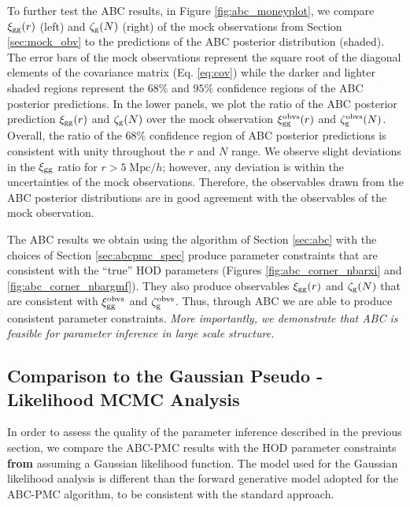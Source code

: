 \documentclass[fleqn,usenatbib]{mnras}
\begin{document}
To further test the ABC results, in Figure \ref{fig:abc_moneyplot}, 
we compare $\xi_{\mathrm{gg}}(r)$ (left) and $\mathcal{\zeta}_{\rm g}(N)$ (right) of the mock observations from Section \ref{sec:mock_obv}
to the predictions of the ABC posterior distribution (shaded). The error bars of the mock observations 
represent the square root of the diagonal elements of the covariance matrix (Eq. \ref{eq:cov}) while the 
darker and lighter shaded regions represent the $68\%$ and $95\%$ confidence regions of the ABC posterior 
predictions. In the lower panels, we plot the ratio of the ABC posterior prediction $\xi_{\mathrm{gg}}(r)$ and $\mathcal{\zeta}_{\rm g}(N)$ over
the mock observation $\xi_{\mathrm{gg}}^\mathrm{obvs}(r)$ and $\mathcal{\zeta}_{\rm g}^\mathrm{obvs}(N)$. Overall, the 
ratio of the $68\%$ confidence region of ABC posterior predictions is consistent with unity 
throughout the $r$ and $N$ range. We observe slight deviations in the $\xi_{\mathrm{gg}}$ ratio for 
$r > 5\;\mathrm{Mpc}/h$; however, any deviation is within the uncertainties of the mock observations. 
Therefore, the observables drawn from the ABC posterior distributions are in good agreement with the
observables of the mock observation. 

The ABC results we obtain using the algorithm of Section \ref{sec:abc} with the choices of
Section \ref{sec:abcpmc_spec} produce parameter constraints that are consistent with 
the ``true'' HOD parameters (Figures \ref{fig:abc_corner_nbarxi} and \ref{fig:abc_corner_nbargmf}).
They also produce observables $\xi_{\mathrm{gg}}(r)$ and $\mathcal{\zeta}_{\rm g}(N)$ that are consistent with $\xi_{\mathrm{gg}}^\mathrm{obvs}$ 
and $\mathcal{\zeta}_{\rm g}^\mathrm{obvs}$. Thus, through ABC we are able to produce consistent 
parameter constraints. {\em More importantly, we demonstrate that ABC is feasible 
for parameter inference in large scale structure.} %

\subsection{Comparison to the Gaussian {\color{dred} Pseudo - Likelihood} MCMC Analysis} \label{sec:abcvsmcmc}
In order to assess the quality of the parameter inference described in the previous section, 
we compare the ABC-PMC results with the HOD parameter constraints 
{\bf \color{dred} from}
assuming a Gaussian likelihood 
function. The model used for the Gaussian likelihood analysis is different than the forward 
generative model adopted for the ABC-PMC algorithm, to be consistent with the standard approach.
\end{document}
